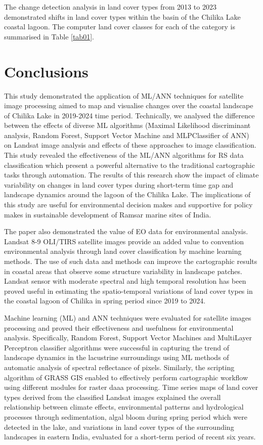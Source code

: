 \documentclass[jmse,article,submit,pdftex,moreauthors]{Definitions/mdpi}
\begin{document}
The change detection analysis in land cover types from 2013 to 2023 demonstrated shifts in land cover types within the basin of the Chilika Lake coastal lagoon. The computer land cover classes for each of the category is summarised in Table \ref{tab01}.

\section{Conclusions}

This study demonstrated the application of ML/ANN techniques for satellite image processing aimed to map and visualise changes over the coastal landscape of Chilika Lake in 2019-2024 time period. Technically, we analysed the difference between the effects of diverse ML algorithms (Maximal Likelihood discriminant analysis, Random Forest, Support Vector Machine and MLPClassifier of ANN) on Landsat image analysis and effects of these approaches to image classification. This study revealed the effectiveness of the ML/ANN algorithms for RS data classification which present a powerful alternative to the traditional cartographic tasks through automation. The results of this research show the impact of climate variability on changes in land cover types during short-term time gap and landscape dynamics around the lagoon of the Chilika Lake. The implications of this study are useful for environmental decision makes and supportive for policy makes in sustainable development of Ramsar marine sites of India.

The paper also demonstrated the value of EO data for environmental analysis. Landsat 8-9 OLI/TIRS satellite images provide an added value to convention environmental analysis through land cover classification by machine learning methods. The use of such data and methods can improve the cartographic results in coastal areas that observe some structure variability in landscape patches. Landsat sensor with moderate spectral and high temporal resolution has been proved useful in estimating the spatio-temporal variations of land cover types in the coastal lagoon of Chilika in spring period since 2019 to 2024. 

Machine learning (ML) and ANN techniques were evaluated for satellite images processing and proved their effectiveness and usefulness for environmental analysis. Specifically, Random Forest, Support Vector Machines and MultiLayer Perceptron classifier algorithms were successful in capturing the trend of landscape dynamics in the lacustrine surroundings using ML methods of automatic analysis of spectral reflectance of pixels. Similarly, the scripting algorithm of GRASS GIS enabled to effectively perform cartographic workflow using different modules for raster daaa processing. Time series maps of land cover types derived from the classified Landsat images explained the overall relationship between climate effects, environmental patterns and hydrological processes through sedimentation, algal bloom during spring period which were detected in the lake, and  variations in land cover types of the surrounding landscapes in eastern India, evaluated for a short-term period of recent six years.
\end{document}
